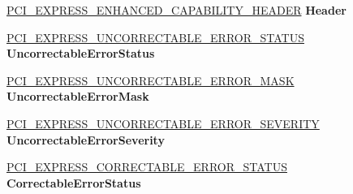 \begin{DoxyCompactItemize}
\item 
\mbox{\label{struct___p_c_i___e_x_p_r_e_s_s___b_r_i_d_g_e___a_e_r___c_a_p_a_b_i_l_i_t_y_afcc0a34384dcab30f27174be2c59d8df}} 
\hyperlink{struct___p_c_i___e_x_p_r_e_s_s___e_n_h_a_n_c_e_d___c_a_p_a_b_i_l_i_t_y___h_e_a_d_e_r}{P\+C\+I\+\_\+\+E\+X\+P\+R\+E\+S\+S\+\_\+\+E\+N\+H\+A\+N\+C\+E\+D\+\_\+\+C\+A\+P\+A\+B\+I\+L\+I\+T\+Y\+\_\+\+H\+E\+A\+D\+ER} {\bfseries Header}
\item 
\mbox{\label{struct___p_c_i___e_x_p_r_e_s_s___b_r_i_d_g_e___a_e_r___c_a_p_a_b_i_l_i_t_y_aa3746923d5b24efb7eccf894496407eb}} 
\hyperlink{union___p_c_i___e_x_p_r_e_s_s___u_n_c_o_r_r_e_c_t_a_b_l_e___e_r_r_o_r___s_t_a_t_u_s}{P\+C\+I\+\_\+\+E\+X\+P\+R\+E\+S\+S\+\_\+\+U\+N\+C\+O\+R\+R\+E\+C\+T\+A\+B\+L\+E\+\_\+\+E\+R\+R\+O\+R\+\_\+\+S\+T\+A\+T\+US} {\bfseries Uncorrectable\+Error\+Status}
\item 
\mbox{\label{struct___p_c_i___e_x_p_r_e_s_s___b_r_i_d_g_e___a_e_r___c_a_p_a_b_i_l_i_t_y_af51dcc55eed2234c877bbdc3e0482af7}} 
\hyperlink{union___p_c_i___e_x_p_r_e_s_s___u_n_c_o_r_r_e_c_t_a_b_l_e___e_r_r_o_r___m_a_s_k}{P\+C\+I\+\_\+\+E\+X\+P\+R\+E\+S\+S\+\_\+\+U\+N\+C\+O\+R\+R\+E\+C\+T\+A\+B\+L\+E\+\_\+\+E\+R\+R\+O\+R\+\_\+\+M\+A\+SK} {\bfseries Uncorrectable\+Error\+Mask}
\item 
\mbox{\label{struct___p_c_i___e_x_p_r_e_s_s___b_r_i_d_g_e___a_e_r___c_a_p_a_b_i_l_i_t_y_a48a0769c461438173611bbdfc06977a5}} 
\hyperlink{union___p_c_i___e_x_p_r_e_s_s___u_n_c_o_r_r_e_c_t_a_b_l_e___e_r_r_o_r___s_e_v_e_r_i_t_y}{P\+C\+I\+\_\+\+E\+X\+P\+R\+E\+S\+S\+\_\+\+U\+N\+C\+O\+R\+R\+E\+C\+T\+A\+B\+L\+E\+\_\+\+E\+R\+R\+O\+R\+\_\+\+S\+E\+V\+E\+R\+I\+TY} {\bfseries Uncorrectable\+Error\+Severity}
\item 
\mbox{\label{struct___p_c_i___e_x_p_r_e_s_s___b_r_i_d_g_e___a_e_r___c_a_p_a_b_i_l_i_t_y_a9f98577003aa2ba1887b8d1e02b76bf5}} 
\hyperlink{union___p_c_i___e_x_p_r_e_s_s___c_o_r_r_e_c_t_a_b_l_e___e_r_r_o_r___s_t_a_t_u_s}{P\+C\+I\+\_\+\+E\+X\+P\+R\+E\+S\+S\+\_\+\+C\+O\+R\+R\+E\+C\+T\+A\+B\+L\+E\+\_\+\+E\+R\+R\+O\+R\+\_\+\+S\+T\+A\+T\+US} {\bfseries Correctable\+Error\+Status}

\end{DoxyCompactItemize}

